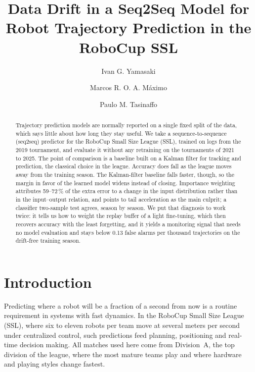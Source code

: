 \documentclass[runningheads]{llncs}
\begin{document}
\title{Data Drift in a Seq2Seq Model for Robot Trajectory Prediction in the RoboCup SSL}

\author{Ivan G. Yamasaki \and
Marcos R. O. A. M\'aximo \and
Paulo M. Tasinaffo}
%
%
%
\maketitle

\begin{abstract}
Trajectory prediction models are normally reported on a single fixed split of
the data, which says little about how long they stay useful. We take a
sequence-to-sequence (seq2seq) predictor for the RoboCup Small Size League
(SSL), trained on logs from the 2019 tournament, and evaluate it without any
retraining on the tournaments of 2021 to 2025. The point of comparison is a
baseline built on a Kalman filter for tracking and prediction, the classical
choice in the league. Accuracy does fall as the league moves away from the
training season. The Kalman-filter baseline falls faster, though, so the margin
in favor of the learned model widens instead of closing. Importance weighting
attributes 59--72\,\% of the extra error to a change in the input distribution
rather than in the input--output relation, and points to tail acceleration as
the main culprit; a classifier two-sample test agrees, season by season. We put
that diagnosis to work twice: it tells us how to weight the replay buffer of a
light fine-tuning, which then recovers accuracy with the least forgetting, and
it yields a monitoring signal that needs no model evaluation and stays below
0.13 false alarms per thousand trajectories on the drift-free training season.
\end{abstract}

\section{Introduction}
\label{sec:intro}

Predicting where a robot will be a fraction of a second from now is a routine
requirement in systems with fast dynamics. In the RoboCup Small Size League
(SSL), where six to eleven robots per team move at several meters per second
under centralized control, such predictions feed planning, positioning and
real-time decision making. All matches used here come from Division~A, the top
division of the league, where the most mature teams play and where hardware and
playing styles change fastest.
\end{document}
